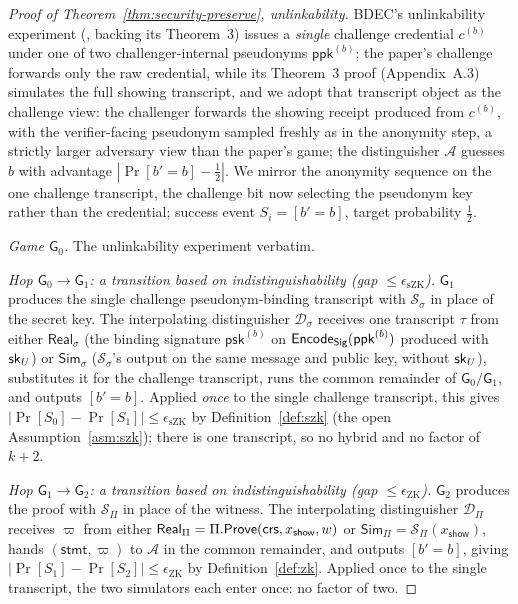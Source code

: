 \begin{proof}[Proof of Theorem~\ref{thm:security-preserve}, unlinkability]
BDEC's unlinkability experiment (\cite[\S3.3]{10.1007/978-981-96-0957-4_3}, backing its Theorem~3) issues a \emph{single} challenge credential $c^{(b)}$ under one of two challenger-internal pseudonyms $\mathsf{ppk}^{(b)}$; the paper's challenge forwards only the raw credential, while its Theorem~3 proof (Appendix~A.3) simulates the full showing transcript, and we adopt that transcript object as the challenge view: the challenger forwards the showing receipt produced from $c^{(b)}$, with the verifier-facing pseudonym sampled freshly as in the anonymity step, a strictly larger adversary view than the paper's game; the distinguisher $\mathcal A$ guesses $b$ with advantage $|\Pr[b'=b]-\tfrac12|$. We mirror the anonymity sequence on the one challenge transcript, the challenge bit now selecting the pseudonym key rather than the credential; success event $S_i=[b'=b]$, target probability $\tfrac12$.

    \smallskip\noindent\emph{Game $\mathsf G_0$.} The unlinkability
experiment verbatim.

    \smallskip\noindent\emph{Hop $\mathsf G_0\to\mathsf G_1$: a transition based on
indistinguishability (gap $\le\epsilon_{\mathrm{sZK}}$).} $\mathsf G_1$ produces the single challenge pseudonym-binding transcript with $\mathcal S_\sigma$ in place of the secret key. The interpolating distinguisher $\mathcal D_\sigma$ receives one transcript $\tau$ from either $\mathsf{Real}_\sigma$ (the binding signature $\mathsf{psk}^{(b)}$ on $\mathsf{Encode}_{\mathsf{Sig}}(\mathsf{ppk}^{(b)})$ produced with $\mathsf{sk}_U$) or $\mathsf{Sim}_\sigma$ ($\mathcal S_\sigma$'s output on the same message and public key, without $\mathsf{sk}_U$), substitutes it for the challenge transcript, runs the common remainder of $\mathsf G_0/\mathsf G_1$, and outputs $[b'=b]$. Applied \emph{once} to the single challenge transcript, this gives $|\Pr[S_0]-\Pr[S_1]|\le\epsilon_{\mathrm{sZK}}$ by Definition~\ref{def:szk} (the open Assumption~\ref{asm:szk}); there is one transcript, so no hybrid and no factor of $k+2$.

    \smallskip\noindent\emph{Hop $\mathsf G_1\to\mathsf G_2$: a transition based on
indistinguishability (gap $\le\epsilon_{\mathrm{ZK}}$).} $\mathsf G_2$ produces the proof with $\mathcal S_\Pi$ in place of the witness. The interpolating distinguisher $\mathcal D_\Pi$ receives $\varpi$ from either $\mathsf{Real}_\Pi=\Pi.\mathsf{Prove}(\mathsf{crs},x_{\mathsf{show}},w)$ or $\mathsf{Sim}_\Pi=\mathcal S_\Pi(x_{\mathsf{show}})$, hands $(\mathsf{stmt},\varpi)$ to $\mathcal A$ in the common remainder, and outputs $[b'=b]$, giving $|\Pr[S_1]-\Pr[S_2]|\le\epsilon_{\mathrm{ZK}}$ by Definition~\ref{def:zk}. Applied once to the single transcript, the two simulators each enter once: no factor of two.


\end{proof}
